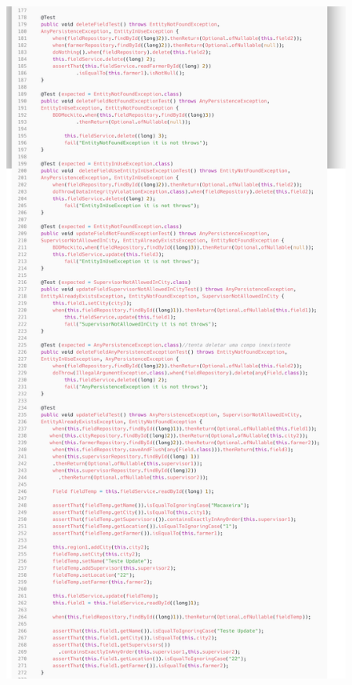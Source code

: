 \begin{itemize}
\begin{figure}[H]
	\centering
	\includegraphics[scale=0.13]{dados/figuras/carbonFieldService2.png}
\end{figure}


\end{itemize}
